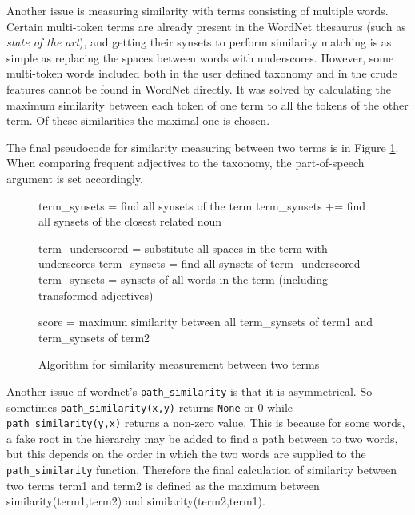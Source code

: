 Another issue is measuring similarity with terms consisting of multiple words. Certain multi-token terms are already present in the WordNet thesaurus (such as \textit{state of the art}), and getting their synsets to perform similarity matching is as simple as replacing the spaces between words with underscores. However, some multi-token words included both in the user defined taxonomy and in the crude features cannot be found in WordNet directly.
It was solved by calculating the maximum similarity between each token of one term to all the tokens of the other term. Of these similarities the maximal one is chosen.

The final pseudocode for similarity measuring between two terms is in Figure \ref{img:sim_alg}. When comparing frequent adjectives to the taxonomy, the part-of-speech argument is set accordingly.
\begin{figure}[!htb]

\begin{algorithm}[H]
   {	
		{
		term\_synsets = find all synsets of the term \;
			{term\_synsets += find all synsets of the closest related noun}
	}

	\Else
		{ 
		term\_underscored = substitute all spaces in the term with underscores \;
		term\_synsets = find all synsets of term\_underscored \;
	}
		{
		term\_synsets = synsets of all words in the term (including transformed adjectives) \;
		}
}
score = maximum similarity between all term\_synsets of term1 and term\_synsets of term2 \;

\end{algorithm}
 \caption{Algorithm for similarity measurement between two terms}
	\label{img:sim_alg}
\end{figure}


Another issue of wordnet's \texttt{path\_similarity} is that it is asymmetrical. So sometimes \texttt{path\_similarity(x,y)} returns \texttt{None} or 0 while \texttt{path\_similarity(y,x)} returns a non-zero value. This is because for some words, a fake root in the hierarchy may be added to find a path between to two words, but this depends on the order in which the two words are supplied to the \texttt{path\_similarity} function. 
Therefore the final calculation of similarity between two terms term1 and term2 is defined as the maximum between similarity(term1,term2) and similarity(term2,term1).

